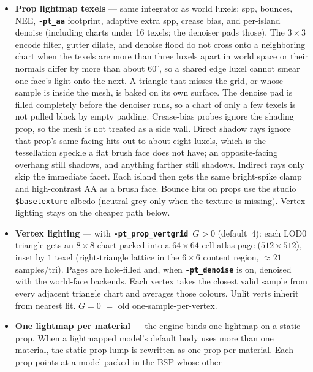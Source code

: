 \documentclass[11pt,a4paper]{article}
\newcommand{\flag}[1]{\texttt{\bfseries #1}}
\newcommand{\vmt}[1]{\texttt{\$#1}}
\begin{document}
\begin{itemize}[leftmargin=1.4em]
  \item \textbf{Prop lightmap texels} --- same integrator as world luxels:
        spp, bounces, NEE, \flag{-pt\_aa} footprint, adaptive extra spp,
        crease bias, and per-island denoise (including charts under 16
        texels; the denoiser pads those). The $3\times3$ encode filter, gutter
        dilate, and denoise flood do not cross onto a neighboring chart when
        the texels are more than three luxels apart in world space or their
        normals differ by more than about $60^{\circ}$, so a shared edge luxel
        cannot smear one face's light onto the next. A triangle that misses
        the grid, or whose sample is inside the mesh, is baked on its own
        surface. The denoise pad is filled completely before the denoiser
        runs, so a chart of only a few texels is not pulled black by empty
        padding. Crease-bias probes ignore the
        shading prop, so the mesh is not treated as a side wall. Direct
        shadow rays ignore that prop's same-facing hits out to about eight
        luxels, which is the tessellation speckle a flat brush face does not
        have; an opposite-facing overhang still shadows, and anything farther
        still shadows. Indirect rays only skip the immediate facet. Each
        island then gets the same bright-spike clamp and high-contrast AA as
        a brush face. Bounce hits on props use the studio \vmt{basetexture}
        albedo (neutral grey only when the texture is missing). Vertex
        lighting stays on the cheaper path below.
  \item \textbf{Vertex lighting} --- with \flag{-pt\_prop\_vertgrid}~$G>0$
        (default~$4$): each LOD0 triangle gets an $8\times8$ chart packed into a
        $64\times64$-cell atlas page ($512\times512$), inset by $1$ texel
        (right-triangle lattice in the $6\times6$ content region,
        $\approx21$ samples/tri). Pages are hole-filled and, when
        \flag{-pt\_denoise} is on, denoised with the world-face backends.
        Each vertex takes the closest valid sample from every adjacent
        triangle chart and averages those colours. Unlit verts inherit from
        nearest lit. $G=0$ $=$ old one-sample-per-vertex.
  \item \textbf{One lightmap per material} --- the engine binds one lightmap
        on a static prop. When a lightmapped model's default body uses more
        than one material, the static-prop lump is rewritten as one prop per
        material. Each prop points at a model packed in the BSP whose other

\end{itemize}
\end{document}
